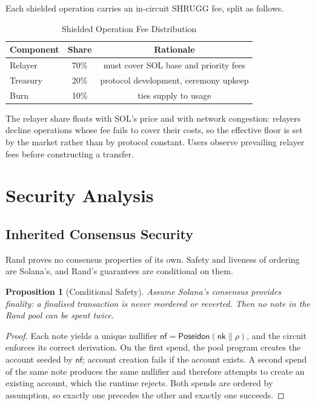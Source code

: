 \documentclass[11pt,a4paper]{article}
\newtheorem{proposition}[theorem]{Proposition}
\begin{document}
Each shielded operation carries an in-circuit SHRUGG fee, split as follows.

\begin{table}[H]
\centering
\caption{Shielded Operation Fee Distribution}
\begin{tabular}{@{}lcc@{}}
\toprule
\textbf{Component} & \textbf{Share} & \textbf{Rationale} \\ \midrule
Relayer & 70\% & must cover SOL base and priority fees \\
Treasury & 20\% & protocol development, ceremony upkeep \\
Burn & 10\% & ties supply to usage \\ \bottomrule
\end{tabular}
\end{table}

The relayer share floats with SOL's price and with network congestion: relayers decline operations whose fee fails to cover their costs, so the effective floor is set by the market rather than by protocol constant. Users observe prevailing relayer fees before constructing a transfer.

\section{Security Analysis}
\label{sec:security}

\subsection{Inherited Consensus Security}

Rand proves no consensus properties of its own. Safety and liveness of ordering are Solana's, and Rand's guarantees are conditional on them.

\begin{proposition}[Conditional Safety]
Assume Solana's consensus provides finality: a finalised transaction is never reordered or reverted. Then no note in the Rand pool can be spent twice.
\end{proposition}

\begin{proof}
Each note yields a unique nullifier $\mathsf{nf} = \mathsf{Poseidon}(\mathsf{nk} \| \rho)$, and the circuit enforces its correct derivation. On the first spend, the pool program creates the account seeded by $\mathsf{nf}$; account creation fails if the account exists. A second spend of the same note produces the same nullifier and therefore attempts to create an existing account, which the runtime rejects. Both spends are ordered by assumption, so exactly one precedes the other and exactly one succeeds.
\end{proof}
\end{document}
